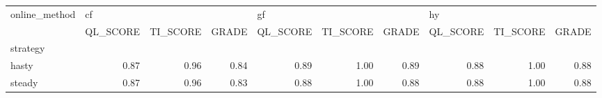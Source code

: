 \begin{tabular}{lrrrrrrrrr}
\toprule
online\_method & \multicolumn{3}{l}{cf} & \multicolumn{3}{l}{gf} & \multicolumn{3}{l}{hy} \\
{} & QL\_SCORE & TI\_SCORE & GRADE & QL\_SCORE & TI\_SCORE & GRADE & QL\_SCORE & TI\_SCORE & GRADE \\
strategy &          &          &       &          &          &       &          &          &       \\
\midrule
hasty    &     0.87 &     0.96 &  0.84 &     0.89 &     1.00 &  0.89 &     0.88 &     1.00 &  0.88 \\
steady   &     0.87 &     0.96 &  0.83 &     0.88 &     1.00 &  0.88 &     0.88 &     1.00 &  0.88 \\
\bottomrule
\end{tabular}
